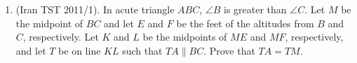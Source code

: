 \documentclass[12pt]{scrartcl}
\begin{document}
\begin{enumerate}
    \item (Iran TST 2011/1). In acute triangle $ABC$, $\angle B$ is greater than $\angle C$. Let $M$ be the midpoint of $BC$ and let $E$ and $F$ be the feet of the altitudes from $B$ and $C$, respectively. Let $K$ and $L$ be the midpoints of $ME$ and $MF$, respectively, and let $T$ be on line $KL$ such that $TA\parallel BC$. Prove that $TA = TM$.
\end{enumerate}
\end{document}
